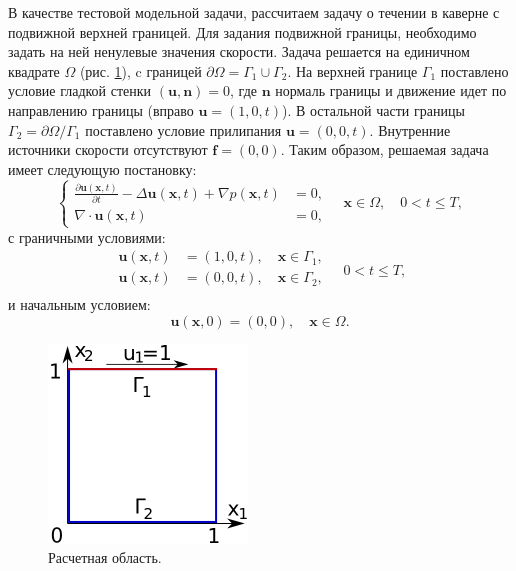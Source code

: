 \documentclass[12pt]{article}
\begin{document}
В качестве тестовой модельной задачи, рассчитаем задачу о течении в каверне с подвижной верхней границей. 
Для задания подвижной границы, необходимо задать на ней ненулевые значения скорости.
Задача решается на единичном квадрате $\Omega$ (рис. \ref{fg:cavity}), c границей $\partial \Omega=\Gamma_1 \cup \Gamma_2$. На верхней границе $\Gamma_1$ поставлено условие гладкой стенки $({\bm u}, {\bm n}) = 0$, где ${\bm n}$ нормаль границы и движение идет по направлению границы (вправо ${\bm u}=(1, 0, t)$). В остальной части границы $\Gamma_2=\partial \Omega / \Gamma_1$ поставлено условие прилипания ${\bm u}=(0, 0, t)$. Внутренние источники скорости отсутствуют ${\bm f}=(0, 0)$. Таким образом, решаемая задача имеет следующую постановку:
\begin{equation}
\left\{
\begin{aligned}
\frac{\partial {\bm u}({\bm x}, t)}{\partial t} -\Delta {\bm u}({\bm x}, t) + \nabla p({\bm x}, t) &= 0, \\
\nabla\cdot{\bm u}({\bm x}, t) &= 0, 
\end{aligned}
\right.
\quad {\bm x} \in \Omega, \quad 0<t \leq T,
\label{eq:scheme-main}
\end{equation} 
с граничными условиями:
\begin{equation}
\begin{split}
{\bm u(\bm x, t)} &= (1, 0, t), \quad {\bm x} \in \Gamma_1,  \\
{\bm u(\bm x, t)} &= (0, 0, t), \quad {\bm x} \in \Gamma_2, \\
\end{split}
\quad 0<t \leq T,
\label{eq:scheme-boundary}
\end{equation} 
и начальным условием:
\begin{equation}
{\bm u(\bm x, 0)} = (0, 0), \quad {\bm x} \in \Omega.
\label{eq:scheme-start}
\end{equation}

\begin{figure}
	\begin{center}
		\includegraphics[width=200px]{pics/cavity400}
		\caption{Расчетная область.}
		\label{fg:cavity}
	\end{center}
\end{figure}
\end{document}
